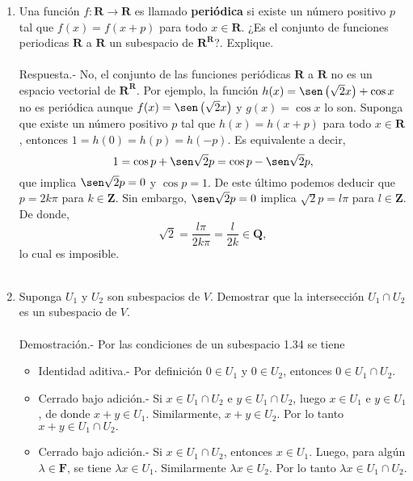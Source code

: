 \begin{enumerate}[\bfseries 1.]
    \item Una función $f:\textbf{R}\to \textbf{R}$ es llamado \textbf{periódica} si existe un número positivo $p$ tal que $f(x)=f(x+p)$ para todo $x\in \textbf{R}$. ¿Es el conjunto de funciones periodicas $\textbf{R}$ a $\textbf{R}$ un subespacio de $\textbf{R}^{\textbf{R}}$?. Explique.\\\\
	Respuesta.-\; No, el conjunto de las funciones periódicas $\textbf{R}$ a $\textbf{R}$ no es un espacio vectorial de $\textbf{R}^{\textbf{R}}$. Por ejemplo, la función $h(x)=\sen\left(\sqrt{2}x\right)+\cos x$ no es periódica aunque $f(x)=\sen\left(\sqrt{2}x\right)$ y $g(x)=\cos x$ lo son. Suponga que existe un número positivo $p$ tal que $h(x)=h(x+p)$ para todo $x\in \textbf{R}$, entonces $1=h(0)=h(p)=h(-p)$. Es equivalente a decir,
	$$1=\cos p + \sen \sqrt{2}p = \cos p - \sen \sqrt{2}p,$$
	que implica $\sen \sqrt{2}p=0$ y $\cos p=1$. De este último podemos deducir que $p=2k\pi$ para $k\in \textbf{Z}$. Sin embargo, $\sen\sqrt{2}p=0$ implica $\sqrt{2}p=l\pi$ para $l\in \textbf{Z}$. De donde,
	$$\sqrt{2}=\dfrac{l\pi}{2k\pi}=\dfrac{l}{2k}\in \textbf{Q},$$
	lo cual es imposible.\\\\

    \item Suponga $U_1$ y $U_2$ son subespacios de $V$. Demostrar que la intersección $U_1\cap U_2$ es un subespacio de $V$.\\\\
	Demostración.-\; Por las condiciones de un subespacio 1.34 se tiene
	\begin{itemize}
	    \item Identidad aditiva.-\; Por definición $0\in U_1$ y $0\in U_2$, entonces $0\in U_1\cap U_2.$
	    \item Cerrado bajo adición.-\; Si $x\in U_1\cap U_2$ e $y\in U_1\cap U_2$, luego $x\in U_1$ e $y\in U_1$, de donde $x+y\in U_1$. Similarmente, $x+y\in U_2$. Por lo tanto $x+y\in U_1\cap U_2.$
	    \item Cerrado bajo adición.-\; Si $x\in U_1\cap U_2$, entonces $x\in U_1$. Luego, para algún $\lambda \in \textbf{F}$, se tiene $\lambda x\in U_1$. Similarmente $\lambda x\in U_2$. Por lo tanto $\lambda x\in U_1\cap U_2$.\\\\
	\end{itemize}


\end{enumerate}
